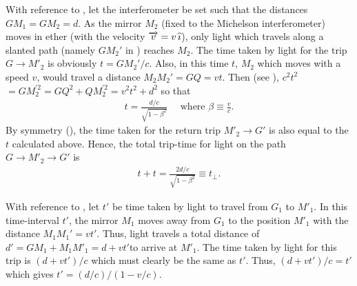  With reference to , let the 
interferometer be set such that the distances $GM_1 = 
GM_2=d$. As the mirror $M_2$ (fixed to the Michelson 
interferometer) moves in ether (with the velocity 
$\overrightarrow{v}=v\,{\widehat{\imath}}$), only light which travels along a slanted 
path (namely $GM_2'$ in ) reaches $M_2$. The 
time taken by light for the trip $G\rightarrow M'_2$ is 
obviously $t =G M_2'/c$.  Also, in this time $t$,  $M_2$ 
which moves with a speed $v$,  would travel a distance $M_2 
M_2' =GQ=vt$. Then (see ), $c^2 t^2$ 
$=GM_2^{'2}= GQ^2 + QM_2^{'2}=v^2 t^2+d^2$ so that
\begin{align*}
t =\frac{d/c}{\sqrt{1-\beta^2}}\quad\text{ where } 
\beta\equiv \frac{v}{c}. 
\end{align*} 
By symmetry (), the time taken for the 
return trip $M'_2\rightarrow G'$ is also equal to the $t$ 
calculated above. Hence, the total trip-time for light on 
the path $G\rightarrow  M'_2\rightarrow G'$ is
\begin{align}\label{sav.2}
t + t =\frac{2d/c}{\sqrt{1-\beta^2}}\equiv t_\perp.
\end{align}

 With 
reference to , let $t'$ be time taken by 
light to travel from $G_1$ to $M'_1$. In this time-interval 
$t'$, the mirror $M_1$ moves away from $G_1$ to the position 
$M'_1$ with the distance $M_1M_1'=vt'$.  Thus, light travels 
a total distance of $d'=GM_1+ M_1M'_1=d+vt'$to arrive at 
$M'_1$. The time taken by light for this trip is $(d+vt')/c$ 
which must clearly be the same as $t'$. Thus, $(d+vt')/c=t'$ 
which gives $t'=(d/c)/(1-v/c)$. 

